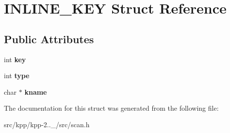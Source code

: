 \hypertarget{structINLINE__KEY}{}\section{I\+N\+L\+I\+N\+E\+\_\+\+K\+EY Struct Reference}
\label{structINLINE__KEY}
\subsection*{Public Attributes}
\begin{DoxyCompactItemize}
\item 
\mbox{\label{structINLINE__KEY_a9972c1862200b664d660023a5996a8d5}} 
int {\bfseries key}
\item 
\mbox{\label{structINLINE__KEY_a561234d58d24785e6331d7d5424f2308}} 
int {\bfseries type}
\item 
\mbox{\label{structINLINE__KEY_aa22b9029776acfc209b2048bbaa43624}} 
char $\ast$ {\bfseries kname}
\end{DoxyCompactItemize}


The documentation for this struct was generated from the following file\+:\begin{DoxyCompactItemize}
\item 
src/kpp/kpp-\/2..\+\_/src/scan.\+h\end{DoxyCompactItemize}
